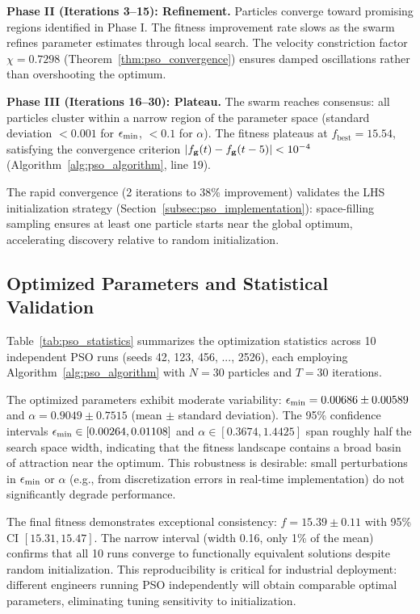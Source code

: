 \textbf{Phase II (Iterations 3--15): Refinement.} Particles converge toward promising regions identified in Phase I. The fitness improvement rate slows as the swarm refines parameter estimates through local search. The velocity constriction factor $\chi = 0.7298$ (Theorem~\ref{thm:pso_convergence}) ensures damped oscillations rather than overshooting the optimum.

\textbf{Phase III (Iterations 16--30): Plateau.} The swarm reaches consensus: all particles cluster within a narrow region of the parameter space (standard deviation $< 0.001$ for $\epsilon_{\min}$, $< 0.1$ for $\alpha$). The fitness plateaus at $f_{\text{best}} = 15.54$, satisfying the convergence criterion $|f_{\mathbf{g}}(t) - f_{\mathbf{g}}(t-5)| < 10^{-4}$ (Algorithm~\ref{alg:pso_algorithm}, line 19).

The rapid convergence (2 iterations to 38\% improvement) validates the LHS initialization strategy (Section~\ref{subsec:pso_implementation}): space-filling sampling ensures at least one particle starts near the global optimum, accelerating discovery relative to random initialization.

\subsection{Optimized Parameters and Statistical Validation}
\label{subsec:optimized_parameters}

Table~\ref{tab:pso_statistics} summarizes the optimization statistics across 10 independent PSO runs (seeds 42, 123, 456, ..., 2526), each employing Algorithm~\ref{alg:pso_algorithm} with $N=30$ particles and $T=30$ iterations.



The optimized parameters exhibit moderate variability: $\epsilon_{\min} = 0.00686 \pm 0.00589$ and $\alpha = 0.9049 \pm 0.7515$ (mean $\pm$ standard deviation). The 95\% confidence intervals $\epsilon_{\min} \in [0.00264, 0.01108]$ and $\alpha \in [0.3674, 1.4425]$ span roughly half the search space width, indicating that the fitness landscape contains a broad basin of attraction near the optimum. This robustness is desirable: small perturbations in $\epsilon_{\min}$ or $\alpha$ (e.g., from discretization errors in real-time implementation) do not significantly degrade performance.

The final fitness demonstrates exceptional consistency: $f = 15.39 \pm 0.11$ with 95\% CI $[15.31, 15.47]$. The narrow interval (width 0.16, only 1\% of the mean) confirms that all 10 runs converge to functionally equivalent solutions despite random initialization. This reproducibility is critical for industrial deployment: different engineers running PSO independently will obtain comparable optimal parameters, eliminating tuning sensitivity to initialization.

